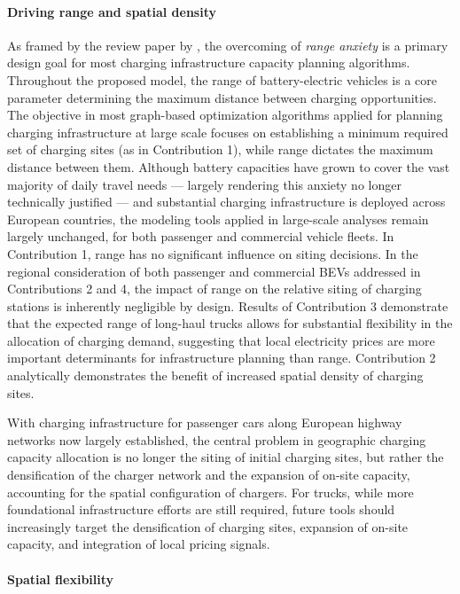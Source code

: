 \paragraph*{Driving range and spatial density} As framed by the review paper by \citet{Metais2022}, the overcoming of \textit{range anxiety} is a primary design goal for most charging infrastructure capacity planning algorithms. Throughout the proposed model, the range of battery-electric vehicles is a core parameter determining the maximum distance between charging opportunities. The objective in most graph-based optimization algorithms applied for planning charging infrastructure at large scale focuses on establishing a minimum required set of charging sites (as in Contribution 1), while range dictates the maximum distance between them. Although battery capacities have grown to cover the vast majority of daily travel needs — largely rendering this anxiety no longer technically justified — and substantial charging infrastructure is deployed across European countries, the modeling tools applied in large-scale analyses remain largely unchanged, for both passenger and commercial vehicle fleets.
In Contribution 1, range has no significant influence on siting decisions. In the regional consideration of both passenger and commercial \acp{BEV} addressed in Contributions 2 and 4, the impact of range on the relative siting of charging stations is inherently negligible by design. Results of Contribution 3 demonstrate that the expected range of long-haul trucks allows for substantial flexibility in the allocation of charging demand, suggesting that local electricity prices are more important determinants for infrastructure planning than range. Contribution 2 analytically demonstrates the benefit of increased spatial density of charging sites.

With charging infrastructure for passenger cars along European highway networks now largely established, the central problem in geographic charging capacity allocation is no longer the siting of initial charging sites, but rather the densification of the charger network and the expansion of on-site capacity, accounting for the spatial configuration of chargers. For trucks, while more foundational infrastructure efforts are still required, future tools should increasingly target the densification of charging sites, expansion of on-site capacity, and integration of local pricing signals.





\paragraph*{Spatial flexibility}


